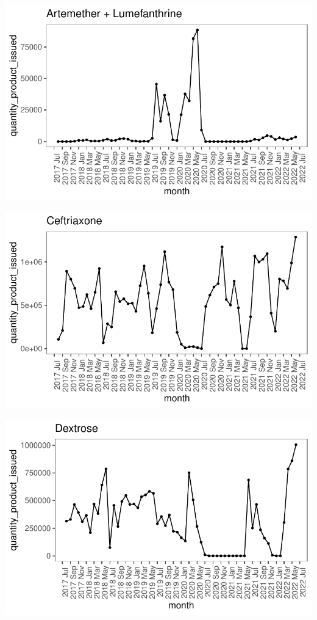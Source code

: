 \documentclass[
  authoryear,
  preprint,
  3p]{elsarticle}
\begin{document}
\includegraphics{main_files/figure-pdf/unnamed-chunk-13-1.pdf}

\includegraphics{main_files/figure-pdf/unnamed-chunk-14-1.pdf}

\includegraphics{main_files/figure-pdf/unnamed-chunk-15-1.pdf}
\end{document}
